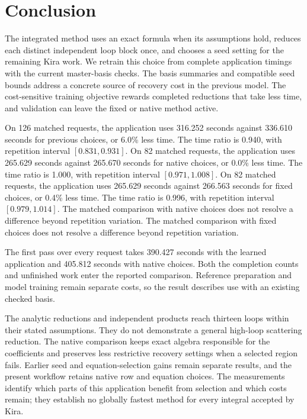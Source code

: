\section{Conclusion}
The integrated method uses an exact formula when its assumptions hold, reduces each distinct independent loop block once, and chooses a seed setting for the remaining Kira work. We retrain this choice from complete application timings with the current master-basis checks. The basis summaries and compatible seed bounds address a concrete source of recovery cost in the previous model. The cost-sensitive training objective rewards completed reductions that take less time, and validation can leave the fixed or native method active.

On 126 matched requests, the application uses 316.252 seconds against 336.610 seconds for previous choices, or 6.0\% less time. The time ratio is 0.940, with repetition interval $[0.831,0.931]$. On 82 matched requests, the application uses 265.629 seconds against 265.670 seconds for native choices, or 0.0\% less time. The time ratio is 1.000, with repetition interval $[0.971,1.008]$. On 82 matched requests, the application uses 265.629 seconds against 266.563 seconds for fixed choices, or 0.4\% less time. The time ratio is 0.996, with repetition interval $[0.979,1.014]$. The matched comparison with native choices does not resolve a difference beyond repetition variation. The matched comparison with fixed choices does not resolve a difference beyond repetition variation.

The first pass over every request takes 390.427 seconds with the learned application and 405.812 seconds with native choices. Both the completion counts and unfinished work enter the reported comparison. Reference preparation and model training remain separate costs, so the result describes use with an existing checked basis.

The analytic reductions and independent products reach thirteen loops within their stated assumptions. They do not demonstrate a general high-loop scattering reduction. The native comparison keeps exact algebra responsible for the coefficients and preserves less restrictive recovery settings when a selected region fails. Earlier seed and equation-selection gains remain separate results, and the present workflow retains native row and equation choices. The measurements identify which parts of this application benefit from selection and which costs remain; they establish no globally fastest method for every integral accepted by Kira.
